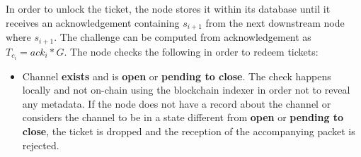 In order to unlock the ticket, the node stores it within its database until it receives an acknowledgement containing $s_{i+1}$ from the next downstream node where $s_{i+1}$. The challenge can be computed from acknowledgement as $T_{c_i}=ack_i*G$. The node checks the following in order to redeem tickets:
\begin{itemize}
\item Channel \textbf{exists} and is \textbf{open} or \textbf{pending to close}. The check happens locally and not on-chain using the blockchain indexer in order not to reveal any metadata. If the node does not have a record about the channel or considers the channel to be in a state different from \textbf{open} or \textbf{pending to close}, the ticket is dropped and the reception of the accompanying packet is rejected.


\end{itemize}
